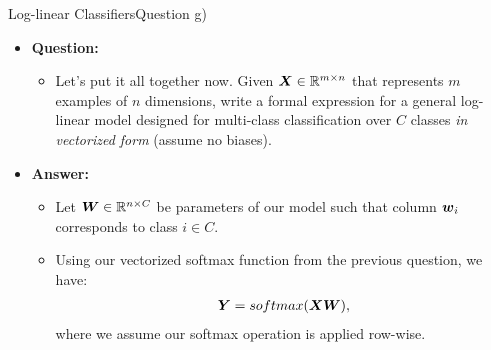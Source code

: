 \documentclass[t]{beamer}
\begin{document}
\begin{frame}{Log-linear Classifiers}{Question g)}
    \begin{itemize}
        \item \textbf{Question:}
              \begin{itemize}
                  \item Let's put it all together now. Given
                        ${\boldsymbol{X}}\in\mathbb{R}^{m\times n}$ that represents $m$ examples
                        of $n$ dimensions, write a formal expression for a
                        general log-linear model designed for multi-class
                        classification over $C$ classes
                        \emph{in vectorized form} (assume no biases).
              \end{itemize}
              \pause
        \item \textbf{Answer:}
              \begin{itemize}
                  \item Let ${\boldsymbol{W}}\in\mathbb{R}^{n\times C}$ be parameters of our
                        model such that column ${\boldsymbol{w}}_i$ corresponds to class
                        $i\in C$.
                  \item Using our vectorized softmax function from the previous
                        question, we have:
                        \begin{align}
                            {\boldsymbol{Y}} = softmax({\boldsymbol{X}}{\boldsymbol{W}}),
                        \end{align}
                        where we assume our softmax operation is applied
                        row-wise.
              \end{itemize}
    \end{itemize}
\end{frame}
\end{document}
